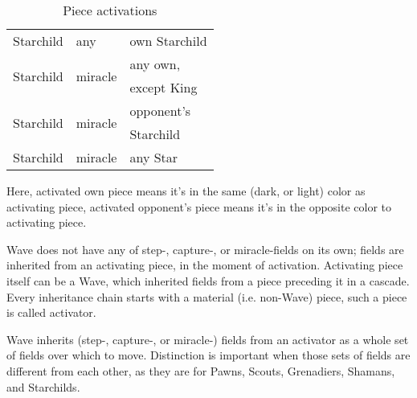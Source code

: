 \begin{table}[!h]
\begin{tabular}{ lll }
\cmidrule{1-3} %
Starchild                               & any                           & own Starchild                 \\
\cmidrule{1-3} %
\multirow{2}{*}{Starchild}              & \multirow{2}{*}{miracle}      & any own,                      \\
                                        &                               & except King                   \\
\cmidrule{1-3} %
\multirow{2}{*}{Starchild}              & \multirow{2}{*}{miracle}      & opponent's                    \\
                                        &                               & Starchild                     \\
\cmidrule{1-3} %
Starchild                               & miracle                       & any Star                      \\
\bottomrule %
\end{tabular}
\caption{Piece activations}
\label{tbl:Appendix/Summary/Piece activations}
\end{table}


Here, activated own piece means it's in the same (dark, or light) color as
activating piece, activated opponent's piece means it's in the opposite color
to activating piece.

Wave does not have any of step-, capture-, or miracle-fields on its own; fields
are inherited from an activating piece, in the moment of activation. Activating
piece itself can be a Wave, which inherited fields from a piece preceding it in
a cascade. Every inheritance chain starts with a material (i.e. non-Wave) piece,
such a piece is called activator.

Wave inherits (step-, capture-, or miracle-) fields from an activator as a whole
set of fields over which to move. Distinction is important when those sets of
fields are different from each other, as they are for Pawns, Scouts, Grenadiers,
Shamans, and Starchilds.

